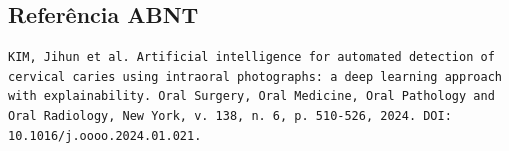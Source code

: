\subsection{Referência ABNT}
\begin{verbatim}
KIM, Jihun et al. Artificial intelligence for automated detection of
cervical caries using intraoral photographs: a deep learning approach
with explainability. Oral Surgery, Oral Medicine, Oral Pathology and
Oral Radiology, New York, v. 138, n. 6, p. 510-526, 2024. DOI:
10.1016/j.oooo.2024.01.021.
\end{verbatim}
\endinput
